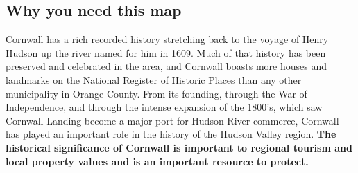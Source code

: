 \subsection*{Why you need this map}
Cornwall has a rich recorded history stretching back to the voyage of Henry 
Hudson up the river named for him in 1609. Much of that history has been 
preserved and celebrated in the area, and Cornwall boasts more houses and 
landmarks on the National Register of Historic Places than any other 
municipality in Orange County. From its founding, through the War of 
Independence, and through the intense expansion of the 1800's, which saw 
Cornwall Landing become a major port for Hudson River commerce, Cornwall has 
played an important role in the history of the Hudson Valley region. \textbf{The 
historical significance of Cornwall is important to regional tourism and local 
property values and is an important resource to protect.}

